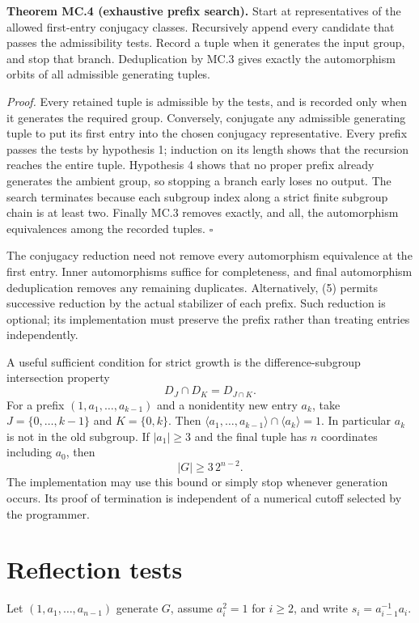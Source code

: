 \documentclass[11pt]{article}
\begin{document}
\textbf{Theorem MC.4 (exhaustive prefix search).} Start at
representatives of the allowed first-entry conjugacy classes.
Recursively append every candidate that passes the admissibility tests.
Record a tuple when it generates the input group, and stop that branch.
Deduplication by MC.3 gives exactly the automorphism orbits of all
admissible generating tuples.

\emph{Proof.} Every retained tuple is admissible by the tests, and is
recorded only when it generates the required group. Conversely,
conjugate any admissible generating tuple to put its first entry into
the chosen conjugacy representative. Every prefix passes the tests by
hypothesis 1; induction on its length shows that the recursion reaches
the entire tuple. Hypothesis 4 shows that no proper prefix already
generates the ambient group, so stopping a branch early loses no output.
The search terminates because each subgroup index along a strict finite
subgroup chain is at least two. Finally MC.3 removes exactly, and all,
the automorphism equivalences among the recorded tuples. \(\square\)

The conjugacy reduction need not remove every automorphism equivalence
at the first entry. Inner automorphisms suffice for completeness, and
final automorphism deduplication removes any remaining duplicates.
Alternatively, (5) permits successive reduction by the actual stabilizer
of each prefix. Such reduction is optional; its implementation must
preserve the prefix rather than treating entries independently.

A useful sufficient condition for strict growth is the
difference-subgroup intersection property \[
 D_J\cap D_K=D_{J\cap K}.
\tag{7}
\] For a prefix \((1,a_1,\ldots,a_{k-1})\) and a nonidentity new entry
\(a_k\), take \(J=\{0,\ldots,k-1\}\) and \(K=\{0,k\}\). Then
\(\langle a_1,\ldots,a_{k-1}\rangle\cap\langle a_k\rangle=1\). In
particular \(a_k\) is not in the old subgroup. If \(|a_1|\geq3\) and the
final tuple has \(n\) coordinates including \(a_0\), then \[
 |G|\geq 3\,2^{n-2}.
\tag{8}
\] The implementation may use this bound or simply stop whenever
generation occurs. Its proof of termination is independent of a
numerical cutoff selected by the programmer.

\section{Reflection tests}\label{reflection-tests}

Let \((1,a_1,\ldots,a_{n-1})\) generate \(G\), assume \(a_i^2=1\) for
\(i\geq2\), and write \(s_i=a_{i-1}^{-1}a_i\).
\end{document}
